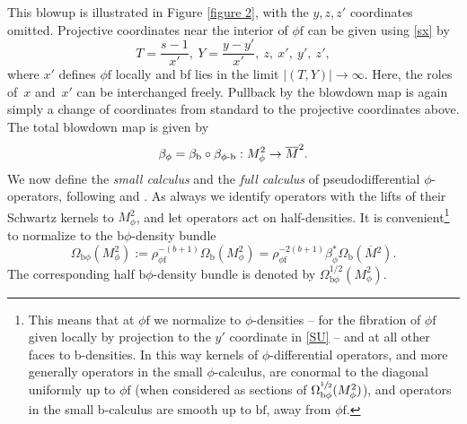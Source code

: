 \documentclass[JEP,XML,SOM,Unicode,NoFloatCountersInSection,published]{cedram}
\newcommand{\phib}{{\phi\textup{-}\bb}}
\newcommand{\bphi}{{\bb\phi}}
\theoremstyle{plain}
\theoremstyle{definition}
\newcommand{\phif}{{\phi\mathrm{f}}}
\newcommand{\bb}{{\mathrm{b}}}
\newcommand{\bbf}{{\mathrm{bf}}}
\newcommand{\Mbar}{{\overline{M}}}\let\M\Mbar
\begin{document}
This blowup is illustrated in Figure \ref{figure 2}, with the $y,z,z'$ coordinates omitted.
Projective coordinates near the interior of $\phif$ can be given using \eqref{sx} by
\begin{equation}\label{SU}
T = \frac{s-1}{x'}, \ Y = \frac{y-y'}{x'},\ z, \ x', \ y', \ z',
\end{equation}
where $x'$ defines $\phif$ locally
and bf lies in the limit $|(T,Y)| \to \infty$. Here, the roles of~$x$ and~$x'$ can be interchanged
freely. Pullback by the blowdown map is again simply
a change of coordinates from standard to \eg the projective coordinates above. The total blowdown map is given by
\begin{align*}
\beta_{\phi} = \beta_\bb\circ \beta_{\phib}
: M^{2}_{\phi} \to \M^{2}.
\end{align*}
We now define the \emph{small calculus} and the \emph{full calculus} of pseudodifferential $\phi$\nobreakdash-ope\-ra\-tors, following
\cite{mazzeo1998pseudodifferential} and \cite{grieser2009pseudodifferential}.
As always we identify operators with the lifts of their Schwartz kernels to $M^2_\phi$, and let operators act on half-densities.
It is convenient\footnote{This means that at $\phif$ we normalize to $\phi$-densities -- for the fibration of $\phif$ given locally by projection to the $y'$ coordinate in \eqref{SU} -- and at all other faces to b-densities. In this way kernels of $\phi$-differential operators, and more generally operators in the small $\phi$-calculus, are conormal to the diagonal
uniformly up to $\phif$ (when considered as sections of $\Omega_{\bphi}^{\sfrac12}(M^2_\phi)$), and operators in the small b-calculus are smooth up to $\bbf$, away from $\phif$.}
to normalize to the $\bphi$-density bundle
\begin{equation}
\label{eqn:densities M2phi}
\Omega_{\bphi}(M^2_\phi) := \rho_\phif^{-(b+1)}\Omega_\bb(M^2_\phi) =
\rho_\phif^{-2(b+1)}\beta_\phi^* \Omega_\bb(\Mbar{}^2).
\end{equation}
The corresponding half $\bphi$-density bundle is denoted by $\Omega^{1/2}_{\bphi}(M^2_\phi)$.
\end{document}
